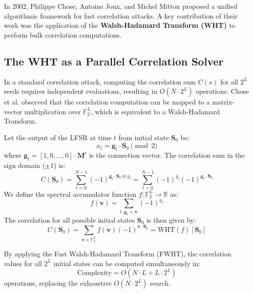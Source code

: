 In 2002, Philippe Chose, Antoine Joux, and Michel Mitton \cite{chose2002} proposed a unified algorithmic framework for fast correlation attacks. A key contribution of their work was the application of the \textbf{Walsh-Hadamard Transform (WHT)} to perform bulk correlation computations.

\subsection{The WHT as a Parallel Correlation Solver}
In a standard correlation attack, computing the correlation sum $C(s)$ for all $2^L$ seeds requires independent evaluations, resulting in $O(N \cdot 2^L)$ operations.
Chose et al. observed that the correlation computation can be mapped to a matrix-vector multiplication over $\mathbb{F}_2^L$, which is equivalent to a Walsh-Hadamard Transform.

Let the output of the LFSR at time $t$ from initial state $\mathbf{S}_0$ be:
$$x_t = \mathbf{g}_t \cdot \mathbf{S}_0 \pmod{2}$$
where $\mathbf{g}_t = [1, 0, \dots, 0] \cdot \mathbf{M}^t$ is the connection vector.
The correlation sum in the sign domain ($\pm 1$) is:
\begin{equation}
C(\mathbf{S}_0) = \sum_{t=0}^{N-1} (-1)^{\mathbf{g}_t \cdot \mathbf{S}_0 \oplus y_t} = \sum_{t=0}^{N-1} (-1)^{y_t} (-1)^{\mathbf{g}_t \cdot \mathbf{S}_0}
\end{equation}
We define the spectral accumulator function $f: \mathbb{F}_2^L \to \mathbb{R}$ as:
\begin{equation}
f(\mathbf{v}) = \sum_{t: \mathbf{g}_t = \mathbf{v}} (-1)^{y_t}
\label{eq:cjm_accumulator}
\end{equation}
The correlation for all possible initial states $\mathbf{S}_0$ is then given by:
\begin{equation}
C(\mathbf{S}_0) = \sum_{\mathbf{v} \in \mathbb{F}_2^L} f(\mathbf{v}) (-1)^{\mathbf{v} \cdot \mathbf{S}_0} = \text{WHT}(f)[\mathbf{S}_0]
\label{eq:wht_spectral_relation}
\end{equation}

By applying the Fast Walsh-Hadamard Transform (FWHT), the correlation values for all $2^L$ initial states can be computed simultaneously in:
$$\text{Complexity} = O(N \cdot L + L \cdot 2^L)$$
operations, replacing the exhaustive $O(N \cdot 2^L)$ search.

